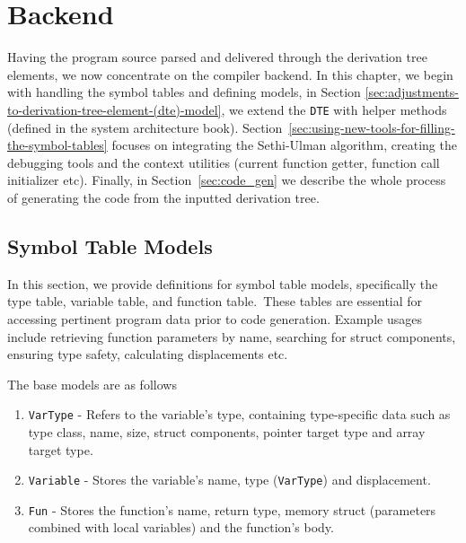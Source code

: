 \chapter{Backend}\label{ch:backend}
Having the program source parsed and delivered through the derivation tree elements, we now
concentrate on the compiler backend.
In this chapter, we begin with handling the symbol tables and defining models, in Section
\ref{sec:adjustments-to-derivation-tree-element-(dte)-model}, we extend the \verb+DTE+
with helper methods (defined in the system architecture book).
Section~\ref{sec:using-new-tools-for-filling-the-symbol-tables} focuses on integrating the Sethi-Ulman algorithm,
creating the debugging tools and the context utilities (current function getter, function call initializer etc).
Finally, in Section~\ref{sec:code_gen} we describe the whole process of generating the code from the inputted derivation tree.


\section{Symbol Table Models}\label{sec:symbol_table_models}
In this section, we provide definitions for symbol table models, specifically the type table, variable table, and function table.\
These tables are essential for accessing pertinent program data prior to code generation.
Example usages include retrieving function parameters by name, searching for struct components, ensuring type safety, calculating displacements etc.

The base models are as follows
\begin{enumerate}
    \item \verb+VarType+ - Refers to the variable's type, containing type-specific data such as type class, name,
    size, struct components, pointer target type and array target type.
    \item \verb+Variable+ - Stores the variable's name, type (\verb+VarType+) and displacement.
    \item \verb+Fun+ - Stores the function's name, return type, memory struct (parameters combined with local variables) and the function's body.
\end{enumerate}

